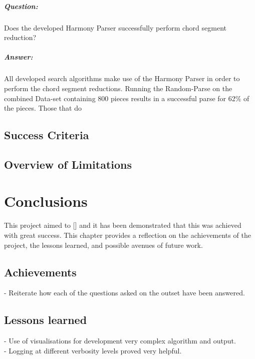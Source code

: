 \documentclass[12pt,a4paper,twoside,openany]{report} \usepackage[pdfborder={0 0 0}]{hyperref}    %
\theoremstyle{definition} \newtheorem{definition}{Definition}[section]
\begin{document}
  \paragraph{Question:} {Does the developed Harmony Parser successfully perform chord segment reduction?}
  \paragraph{Answer:} {All developed search algorithms make use of the Harmony Parser in order to perform the chord
  segment reductions. Running the Random-Parse on the combined Data-set containing 800 pieces results in a successful
  parse for 62\% of the pieces. Those that do}


\section{Success Criteria}
\label{sec:successCriteriaEval}

\section{Overview of Limitations}



      \chapter{Conclusions} 
      This project aimed to [] and it has been demonstrated that this was achieved with great success. 
      This chapter provides a reflection on the achievements of the project, the lessons learned, and possible avenues of future work.

      \section{Achievements}

      - Reiterate how each of the questions asked on the outset have been answered. \\

      \section{Lessons learned}

      - Use of visualisations for development very complex algorithm and output. \\
      - Logging at different verbosity levels proved very helpful. \\
\end{document}
